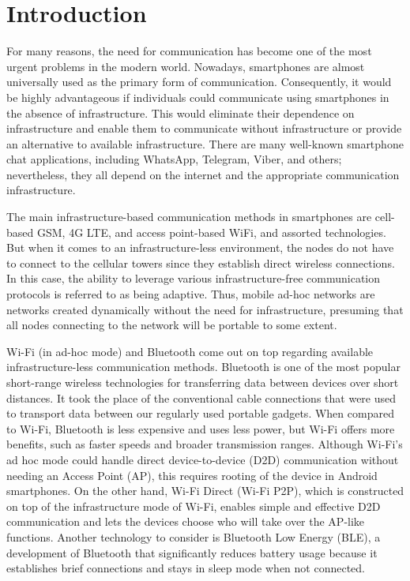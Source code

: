 \section{Introduction}

For many reasons, the need for communication has become one of the most urgent
problems in the modern world. Nowadays, smartphones are almost universally used
as the primary form of communication. Consequently, it would be highly
advantageous if individuals could communicate using smartphones in the absence
of infrastructure. This would eliminate their dependence on infrastructure and
enable them to communicate without infrastructure or provide an alternative to
available infrastructure. There are many well-known smartphone chat
applications, including WhatsApp, Telegram, Viber, and others;
nevertheless, they all depend on the internet and the appropriate communication
infrastructure.

The main infrastructure-based communication methods in smartphones are
cell-based GSM, 4G LTE, and access point-based WiFi, and assorted technologies.
But when it comes to an infrastructure-less environment, the nodes do not have
to connect to the
cellular towers since they establish direct wireless connections. In this case,
the ability to leverage various infrastructure-free communication protocols is
referred to as being adaptive. Thus, mobile ad-hoc networks are networks
created dynamically without the need for infrastructure, presuming that all
nodes connecting to the network will be portable to some
extent\cite{chlamtac2003}.

Wi-Fi (in ad-hoc mode) and Bluetooth come out on top regarding available
infrastructure-less communication methods. Bluetooth is one of the most popular
short-range wireless technologies for transferring data between devices over
short distances. It took the place of the conventional cable connections that
were used to transport data between our regularly used portable gadgets. When
compared to Wi-Fi, Bluetooth is less expensive and uses less power, but Wi-Fi
offers more benefits, such as faster speeds and broader transmission ranges.
Although Wi-Fi's ad hoc mode could handle direct device-to-device (D2D)
communication without needing an Access Point (AP), this requires rooting of
the device in Android smartphones\cite{soares2017}. On the other hand, Wi-Fi
Direct (Wi-Fi P2P), which is
constructed on top of the infrastructure mode of Wi-Fi, enables simple and
effective D2D communication and lets the devices choose who will take over the
AP-like functions. Another technology to consider is Bluetooth Low Energy
(BLE), a development of Bluetooth that significantly reduces battery usage
because it establishes brief connections and stays in sleep mode when not
connected.

